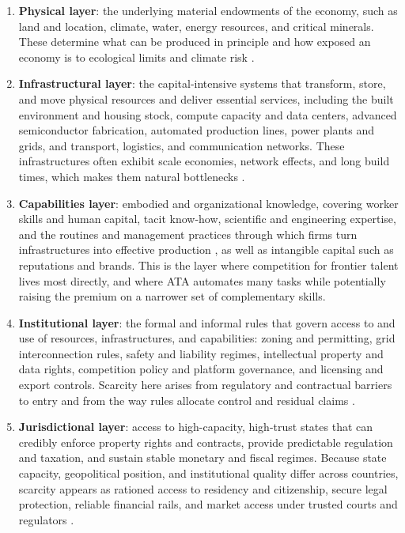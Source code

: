 \documentclass[11pt]{article}
\begin{document}
\begin{enumerate}
 \item \textbf{Physical layer}: the underlying material endowments of the economy, such as land and location, climate, water, energy resources, and critical minerals. These determine what can be produced in principle and how exposed an economy is to ecological limits and climate risk \citep[e.g.][]{Rockstrom2009}.

 \item \textbf{Infrastructural layer}: the capital-intensive systems that transform, store, and move physical resources and deliver essential services, including the built environment and housing stock, compute capacity and data centers, advanced semiconductor fabrication, automated production lines, power plants and grids, and transport, logistics, and communication networks. These infrastructures often exhibit scale economies, network effects, and long build times, which makes them natural bottlenecks \citep{OECD2024AIData,OECD2025AIInfra}.

 \item \textbf{Capabilities layer}: embodied and organizational knowledge, covering worker skills and human capital, tacit know-how, scientific and engineering expertise, and the routines and management practices through which firms turn infrastructures into effective production \citep[e.g.][]{Becker1993HumanCapital,NelsonWinter1982,Teece1997DynamicCapabilities}, as well as intangible capital such as reputations and brands. This is the layer where competition for frontier talent lives most directly, and where ATA automates many tasks while potentially raising the premium on a narrower set of complementary skills.

 \item \textbf{Institutional layer}: the formal and informal rules that govern access to and use of resources, infrastructures, and capabilities: zoning and permitting, grid interconnection rules, safety and liability regimes, intellectual property and data rights, competition policy and platform governance, and licensing and export controls. Scarcity here arises from regulatory and contractual barriers to entry and from the way rules allocate control and residual claims \citep[see][]{North1990Institutions, AcemogluRobinson2012}.

 \item \textbf{Jurisdictional layer}: access to high-capacity, high-trust states that can credibly enforce property rights and contracts, provide predictable regulation and taxation, and sustain stable monetary and fiscal regimes. Because state capacity, geopolitical position, and institutional quality differ across countries, scarcity appears as rationed access to residency and citizenship, secure legal protection, reliable financial rails, and market access under trusted courts and regulators \citep[e.g.][]{BesleyPersson2009StateCapacity}.
\end{enumerate}
\end{document}
